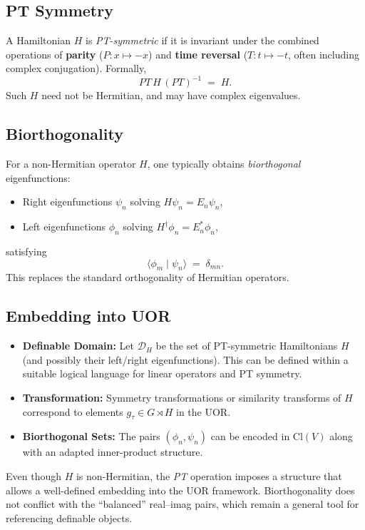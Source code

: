 \documentclass[11pt]{article}
\begin{document}
\subsection{PT Symmetry}
A Hamiltonian $H$ is \emph{PT-symmetric} if it is invariant under the combined operations of \textbf{parity} ($P:x\mapsto -x$) and \textbf{time reversal} ($T:t\mapsto -t$, often including complex conjugation).  Formally,
\[
PT\,H\,(PT)^{-1} \;=\; H.
\]
Such $H$ need not be Hermitian, and may have complex eigenvalues.

\subsection{Biorthogonality}
For a non-Hermitian operator $H$, one typically obtains \emph{biorthogonal} eigenfunctions:
\begin{itemize}
    \item Right eigenfunctions $\psi_n$ solving $H\psi_n = E_n \psi_n$,
    \item Left eigenfunctions $\phi_n$ solving $H^\dagger \phi_n = E_n^* \phi_n$,
\end{itemize}
satisfying
\[
\langle \phi_m \mid \psi_n \rangle \;=\; \delta_{mn}.
\]
This replaces the standard orthogonality of Hermitian operators.

\subsection{Embedding into UOR}
\begin{itemize}
\item \textbf{Definable Domain:} Let $\mathcal{D}_H$ be the set of PT-symmetric Hamiltonians $H$ (and possibly their left/right eigenfunctions).  This can be defined within a suitable logical language for linear operators and PT symmetry.
\item \textbf{Transformation:} Symmetry transformations or similarity transforms of $H$ correspond to elements $g_\tau \in G\rtimes H$ in the UOR.
\item \textbf{Biorthogonal Sets:} The pairs $(\phi_n,\psi_n)$ can be encoded in $\mathrm{Cl}(V)$ along with an adapted inner-product structure.  
\end{itemize}

Even though $H$ is non-Hermitian, the \emph{PT} operation imposes a structure that allows a well-defined embedding into the UOR framework. Biorthogonality does not conflict with the “balanced” real--imag pairs, which remain a general tool for referencing definable objects.
\end{document}
